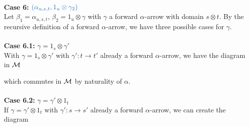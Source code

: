 \begin{prf}
        \\
        \textbf{Case 6:} $\textcolor{NavyBlue}{(\alpha_{u,s,t},1_u \otimes \gamma_2)}$\\
        Let $\beta_1 = \alpha_{u,s,t}$, $\beta_2 = 1_u \otimes \gamma$
        with $\gamma$ a forward $\alpha$-arrow with domain $s \otimes t$. 
        By the recursive definition of a forward $\alpha$-arrow, 
        we have three possible cases for $\gamma$.
        \\
        \\
        \textbf{Case 6.1: }$\gamma = 1_s \otimes \gamma'$\\
        With $\gamma = 1_s \otimes \gamma'$ with $\gamma' : t\to t'$ 
        already a forward $\alpha$-arrow,
        we have the diagram in $\mathcal{M}$
        \begin{center}
        \end{center}
        which commutes in $\mathcal{M}$ by naturality of $\alpha$.
        \\
        \\
        \textbf{Case 6.2:} $\gamma = \gamma' \otimes 1_t$\\
        If $\gamma = \gamma' \otimes 1_t$ with $\gamma': s \to s'$ 
        already a forward $\alpha$-arrow, we can create the diagram 
        \begin{center}
\end{center}
\end{prf}
